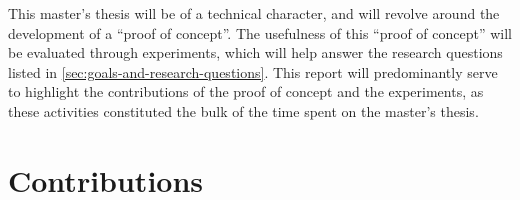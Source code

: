 \begin{comment}
What methodology will you apply to address the goals: theoretic/analytic, model/abstraction or design/experiment?
This section will describe the research methodology applied and the reason for this choice of research methodology.
You should return to the actual choices made in the work and the alternatives in the Discussion chapter.
\end{comment}

This master's thesis will be of a technical character, and will revolve around the development of a \enquote{proof of concept}. The usefulness of this \enquote{proof of concept} will be evaluated through experiments, which will help answer the research questions listed in \autoref{sec:goals-and-research-questions}. This report will predominantly serve to highlight the contributions of the proof of concept and the experiments, as these activities constituted the bulk of the time spent on the master's thesis.

\section{Contributions}
\label{sec:intro-contributions}

\begin{comment}
This section just provides a brief summary of the main contributions of the work.
The main description of the contributions will come in Section~\ref{sec:contributions}, after the results are presented.
(Hence Section~\ref{sec:introContributions} can also be left out, leaving the discussion completely to Section~\ref{sec:contributions}.)

The format of this section will generally be as follows:

\begin{enumerate}
    \item \textit{Lorem ipsum dolor sit amet, consectetur adipiscing elit.}
    \item \textit{Lorem ipsum dolor sit amet, consectetur adipiscing elit.}
    \item \textit{Lorem ipsum dolor sit amet, consectetur adipiscing elit.}
\end{enumerate}

\noindent
where the items on the list briefly describe the key contributions.

The order of the contributions here is important. List your main contribution first!
Creating this list will help you not only with writing the Conclusion (where all items listed here definitely should be included, and in more detail),
but also with items that need to be mentioned in the Abstract, as well as with points that you will want to bring to attention in the Discussion.
Hence most of the content on this list will be addressed 4--5 times in your text: here, in the Abstract, Discussion, Conclusion, and (most likely)
in the Results chapter.
\end{comment}

